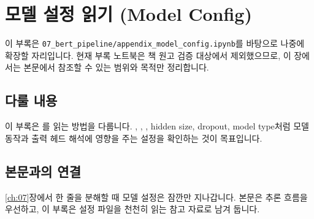 \chapter{모델 설정 읽기 (Model Config)}

\begin{noteBox}[부록 원고 상태]
이 부록은 \texttt{07\_bert\_pipeline/appendix\_model\_config.ipynb}를 바탕으로 나중에 확장할 자리입니다. 현재 부록 노트북은 책 원고 검증 대상에서 제외했으므로, 이 장에서는 본문에서 참조할 수 있는 범위와 목적만 정리합니다.
\end{noteBox}

\section*{다룰 내용}

이 부록은 를 읽는 방법을 다룹니다. , , , hidden size, dropout, model type처럼 모델 동작과 출력 헤드 해석에 영향을 주는 설정을 확인하는 것이 목표입니다.

\section*{본문과의 연결}

\ref{ch:07}장에서  한 줄을 분해할 때 모델 설정은 잠깐만 지나갑니다. 본문은 추론 흐름을 우선하고, 이 부록은 설정 파일을 천천히 읽는 참고 자료로 남겨 둡니다.
